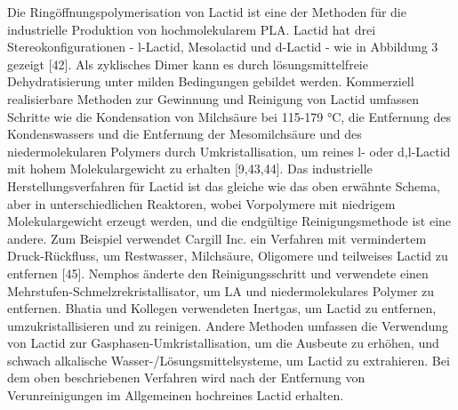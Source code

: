 \documentclass[10pt]{article}
\begin{document}
    Die Ringöffnungspolymerisation von Lactid ist eine der Methoden für die industrielle Produktion von hochmolekularem PLA. Lactid hat drei Stereokonfigurationen - l-Lactid, Mesolactid und d-Lactid - wie in Abbildung 3 gezeigt [42].
    Als zyklisches Dimer kann es durch lösungsmittelfreie Dehydratisierung unter milden Bedingungen gebildet werden.
    Kommerziell realisierbare Methoden zur Gewinnung und Reinigung von Lactid umfassen Schritte wie die Kondensation von Milchsäure bei 115-179 °C, die Entfernung des Kondenswassers und die Entfernung der Mesomilchsäure und des niedermolekularen Polymers durch Umkristallisation, um reines l- oder d,l-Lactid mit hohem Molekulargewicht zu erhalten [9,43,44].
    Das industrielle Herstellungsverfahren für Lactid ist das gleiche wie das oben erwähnte Schema, aber in unterschiedlichen Reaktoren, wobei Vorpolymere mit niedrigem Molekulargewicht erzeugt werden, und die endgültige Reinigungsmethode ist eine andere.
    Zum Beispiel verwendet Cargill Inc.
    ein Verfahren mit vermindertem Druck-Rückfluss, um Restwasser, Milchsäure, Oligomere und teilweises Lactid zu entfernen [45].
    Nemphos änderte den Reinigungsschritt und verwendete einen Mehrstufen-Schmelzrekristallisator, um LA und niedermolekulares Polymer zu entfernen.
    Bhatia und Kollegen verwendeten Inertgas, um Lactid zu entfernen, umzukristallisieren und zu reinigen.
    Andere Methoden umfassen die Verwendung von Lactid zur Gasphasen-Umkristallisation, um die Ausbeute zu erhöhen, und schwach alkalische Wasser-/Lösungsmittelsysteme, um Lactid zu extrahieren.
    Bei dem oben beschriebenen Verfahren wird nach der Entfernung von Verunreinigungen im Allgemeinen hochreines Lactid erhalten.
\end{document}
